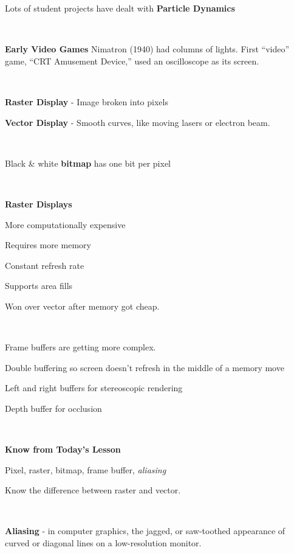 Lots of student projects have dealt with {\bf Particle Dynamics}

\

{\bf Early Video Games}  Nimatron (1940) had columns of lights.   First ``video'' game, ``CRT Amusement Device,'' used an oscilloscope as its screen.  

\

{\bf Raster Display} - Image broken into pixels

{\bf Vector Display} - Smooth curves, like moving lasers or electron beam.  

\

Black \& white {\bf bitmap} has one bit per pixel

\

{\bf Raster Displays}

More computationally expensive

Requires more memory

Constant refresh rate

Supports area fills

Won over vector after memory got cheap.  

\

Frame buffers are getting more complex.  

\qquad Double buffering so screen doesn't refresh in the middle of a memory move

\qquad Left and right buffers for stereoscopic rendering

\qquad Depth buffer for occlusion

\

{\bf Know from Today's Lesson}

Pixel, raster, bitmap, frame buffer, {\it aliasing}

Know the difference between raster and vector.  

\

{\bf Aliasing} - in computer graphics, the jagged, or saw-toothed appearance of curved or diagonal lines on a low-resolution monitor.

